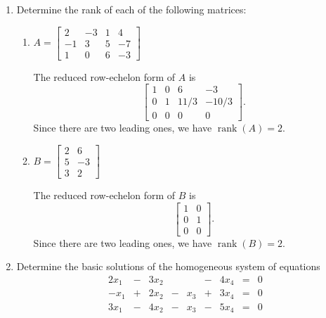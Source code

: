 \documentclass[12pt]{article}
\newcommand{\bbm}{\begin{bmatrix}}
\newcommand{\ebm}{\end{bmatrix}}
\DeclareMathOperator{\rank}{rank}
\begin{document}
\thispagestyle{fancy}
 \begin{enumerate}
\item Determine the rank of each of the following matrices:
\begin{multicols}{2}
\begin{enumerate}
 \item $A = \bbm 2&-3&1&4\\-1&3&5&-7\\1&0&6&-3\ebm$

\medskip

The reduced row-echelon form of $A$ is
\[
 \bbm 1&0&6&-3\\0&1&11/3&-10/3\\0&0&0&0\ebm.
\]
Since there are two leading ones, we have $\rank(A)=2$.

 \item $B = \bbm 2&6\\5&-3\\3&2\ebm$

\medskip

The reduced row-echelon form of $B$ is
\[
 \bbm 1&0\\0&1\\0&0\ebm.
\]
Since there are two leading ones, we have $\rank(B)=2$.


\end{enumerate}
\end{multicols}

\vspace{0.5in}

\item Determine the basic solutions of the homogeneous system of equations
\[
 \begin{array}{ccccccccc}
  2x_1&-&3x_2& &   &-&4x_4&=&0\\
  -x_1&+&2x_2&-&x_3&+&3x_4&=&0\\
  3x_1&-&4x_2&-&x_3&-&5x_4&=&0
 \end{array}
\]


\end{enumerate}
\end{document}
